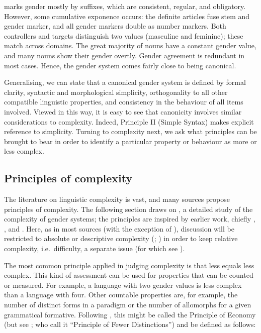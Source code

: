 \documentclass[output=collectionpaper]{langsci/langscibook}
\begin{document}
 marks gender mostly by suffixes, which are consistent, regular, and obligatory. However, some cumulative exponence occurs: the definite articles fuse stem and gender marker, and all gender markers double as number markers. Both controllers and targets distinguish two values (masculine and feminine); these match across domains. The great majority of nouns have a constant gender value, and many nouns show their gender overtly. Gender agreement is redundant in most cases. Hence, the  gender system comes fairly close to being canonical.

Generalising, we can state that a canonical gender system is defined by formal clarity, syntactic and morphological simplicity, orthogonality to all other compatible linguistic properties, and consistency in the behaviour of all items involved. Viewed in this way, it is easy to see that canonicity involves similar considerations to complexity. Indeed, Principle II (Simple Syntax) makes explicit reference to simplicity. Turning to complexity next, we ask what principles can be brought to bear in order to identify a particular property or behaviour as more or less complex.

\subsection{Principles of complexity}
\label{sec:Audr:2.3}

The literature on linguistic complexity is vast, and many sources propose principles of complexity. The following section draws on \citet{Audring2017}, a detailed study of the complexity of gender systems; the principles are inspired by earlier work, chiefly \citet{Kusters2003}, \citet{Miestamo2008}, and \citet{DiGarbo2014,DiGarbo2016}. Here, as in most sources (with the exception of \citealt{Kusters2003}), discussion will be restricted to absolute or descriptive complexity (\citealt{Miestamo2008}; \citealt{Sinnemaeki2011,Sinnemaeki2014}) in order to keep relative complexity, i.e.\ difficulty, a separate issue (for which see ‎).

The most common principle applied in judging complexity is that less equals less complex. This kind of assessment can be used for properties that can be counted or measured. For example, a language with two gender values is less complex than a language with four. Other countable properties are, for example, the number of distinct forms in a paradigm or the number of allomorphs for a given grammatical formative. Following \citet{Kusters2003}, this might be called the Principle of Economy (but see \citealt{Miestamo2008};  who call it ``Principle of Fewer Distinctions'') and be defined as follows:
\end{document}
